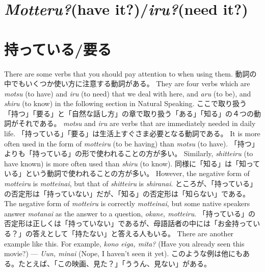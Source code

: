 \documentclass[uplatex,dvipdfmx,b5paper,english,10pt]{jsbook}
\begin{document}
%


\ifEnglish
\section{{\it Motteru?\/}(have it?)/{\it iru?\/}(need it?)}
\else
\section{持っている/要る}
\fi

\ifEnglish
There are some verbs that you should pay attention to when using them.
\else
動詞の中でもいくつか使い方に注意する動詞がある。
\fi
\ifEnglish
They are four verbs which are  {\it motsu\/} (to have) and {\it iru\/} (to need) that we deal with here, and {\it aru\/} (to be), and {\it shiru\/} (to know) in the following section in Natural Speaking.
\else
ここで取り扱う「持つ」「要る」と「自然な話し方」の章で取り扱う「ある」「知る」の４つの動詞がそれである。
\fi
\ifEnglish
{\it motsu\/} and {\it iru\/} are verbs that are immediately needed in daily life.
\else
「持っている」「要る」は生活上すぐさま必要となる動詞である。
\fi
\ifEnglish
It is more often used in the form of {\it motteiru\/} (to be having) than {\it motsu\/} (to have).
\else
「持つ」よりも「持っている」の形で使われることの方が多い。
\fi
\ifEnglish
Similarly, {\it shitteiru\/} (to have known) is more often used than {\it shiru\/} (to know).
\else
同様に「知る」は「知っている」という動詞で使われることの方が多い。
\fi
\ifEnglish
However, the negative form of {\it motteiru\/} is {\it motteinai\/}, but that of {\it shitteiru\/} is {\it shiranai\/}.
\else
ところが、「持っている」の否定形は「持っていない」だが、「知る」の否定形は「知らない」である。
\fi
\ifEnglish
The negative form of {\it motteiru\/} is correctly {\it motteinai\/}, but some native speakers answer {\it motanai\/} as the answer to a question, {\it okane, motteiru\/}.
\else
「持っている」の否定形は正しくは「持っていない」であるが、母語話者の中には「お金持っている？」の答えとして「持たない」と答える人もいる。
\fi
\ifEnglish
There are another example like this. For example, {\it kono eiga, mita?\/} (Have you already seen this movie?) --- {\it Uun, minai\/} (Nope, I haven't seen it yet).
\else
このような例は他にもある。たとえば、「この映画、見た？」「ううん、見ない」がある。
\fi
\end{document}

